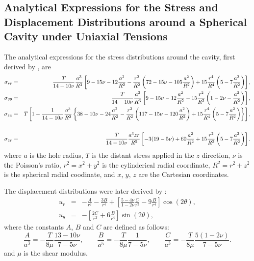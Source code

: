 \documentclass[sn-mathphys,Numbered]{sn-jnl}%
\begin{document}
\begin{appendices}
\section{Analytical Expressions for the Stress and Displacement Distributions around a Spherical Cavity under Uniaxial Tensions} \label{app:sphericalCavity}
The analytical expressions for the stress distributions around the cavity, first derived by \citet{Southwell1926}, are
\begin{eqnarray}
	\sigma_{rr} &=&
		\frac{T}{14 - 10\nu} \frac{a^3}{R^3}
		\left[ 9 - 15\nu - 12 \frac{a^2}{R^2}  - \frac{r^2}{R^2} \left( 72 - 15\nu - 105 \frac{a^2}{R^2} \right) + 15 \frac{r^4}{R^4} \left( 5 - 7 \frac{a^2}{R^2} \right) \right], \\
	\sigma_{\theta\theta} &=&
		\frac{T}{14 - 10\nu} \frac{a^3}{R^3}
		\left[ 9 - 15\nu - 12 \frac{a^2}{R^2}  - 15 \frac{r^2}{R^2} \left( 1 - 2\nu - \frac{a^2}{R^2} \right) \right], \\
	\sigma_{zz} &=&
		T \left[ 1 - \frac{1}{14 - 10\nu} \frac{a^3}{R^3} \left\{ 38 - 10\nu - 24 \frac{a^2}{R^2} 
		- \frac{r^2}{R^2} \left( 117 - 15\nu - 120 \frac{a^2}{R^2} \right)
		+ 15 \frac{r^4}{R^4} \left( 5 - 7 \frac{a^2}{R^2} \right) \right\} \right], \notag \\
		\\
	\sigma_{zr} &=&
	\frac{T}{14 - 10\nu} \frac{a^3 z r}{R^5}
	\left[ -3(19 - 5\nu) + 60 \frac{a^2}{R^2} + 15 \frac{r^2}{R^2} \left( 5 - 7 \frac{a^2}{R^2} \right)  \right].
\end{eqnarray}
where $a$ is the hole radius, $T$ is the distant stress applied in the $z$ direction, $\nu$ is the Poisson's ratio, $r^2 = x^2 + y^2$ is the cylinderical radial coordinate, $R^2 = r^2 + z^2$ is the spherical radial coodinate, and $x$, $y$, $z$ are the Cartesian coordinates.

The displacement distributions were later derived by \citet{Goodier1933}:
\begin{eqnarray}
u_r &=& -\frac{A}{r^2} - \frac{3B}{r^4} + \left[ \frac{5-4\nu}{1-2\nu} \frac{C}{r^2}-9\frac{B}{r^4} \right]\cos (2\theta),\\
u_{\theta} &=& - \left[ \frac{2C}{r^2} + 6\frac{B}{r^4}  \right]\sin(2\theta),
\end{eqnarray}
where the constants $A$, $B$ and $C$ are defined as follows:
\begin{equation}
\frac{A}{a^3} = -\frac{T}{8\mu}\frac{13-10\nu}{7-5\nu}, \qquad
\frac{B}{a^5} = -\frac{T}{8\mu}\frac{1}{7-5\nu}, \qquad
\frac{C}{a^3} = -\frac{T}{8\mu}\frac{5(1-2\nu)}{7-5\nu}.
\end{equation}
and $\mu$ is the shear modulus.


\end{appendices}


\end{document}
